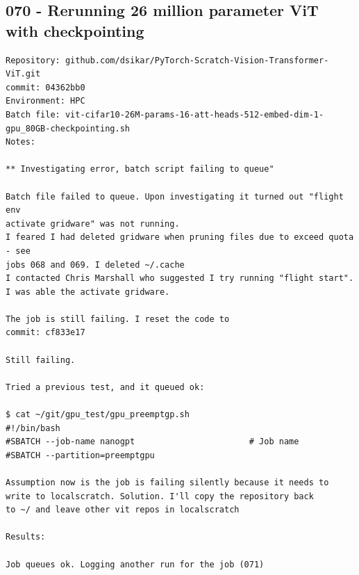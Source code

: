 \subsection{070 - Rerunning 26 million parameter ViT with checkpointing}
\label{app_res:070}
\begin{verbatim}
Repository: github.com/dsikar/PyTorch-Scratch-Vision-Transformer-ViT.git
commit: 04362bb0
Environment: HPC 
Batch file: vit-cifar10-26M-params-16-att-heads-512-embed-dim-1-gpu_80GB-checkpointing.sh
Notes: 

** Investigating error, batch script failing to queue"

Batch file failed to queue. Upon investigating it turned out "flight env 
activate gridware" was not running.
I feared I had deleted gridware when pruning files due to exceed quota - see
jobs 068 and 069. I deleted ~/.cache
I contacted Chris Marshall who suggested I try running "flight start".
I was able the activate gridware.

The job is still failing. I reset the code to 
commit: cf833e17

Still failing.

Tried a previous test, and it queued ok:

$ cat ~/git/gpu_test/gpu_preemptgp.sh 
#!/bin/bash 
#SBATCH --job-name nanogpt                       # Job name
#SBATCH --partition=preemptgpu 

Assumption now is the job is failing silently because it needs to
write to localscratch. Solution. I'll copy the repository back
to ~/ and leave other vit repos in localscratch

Results:

Job queues ok. Logging another run for the job (071)
          
\end{verbatim}


